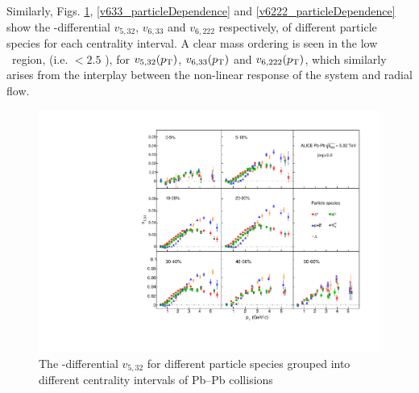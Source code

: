 \documentclass[ALICE,manyauthors]{cernphprep}
\providecommand{\DIFaddbeginFL}{} %
\providecommand{\DIFaddendFL}{} %
\providecommand{\DIFdelbeginFL}{} %
\providecommand{\DIFdelendFL}{} %
\begin{document}
Similarly, Figs. \ref{v523_particleDependence}, \ref{v633_particleDependence} and \ref{v6222_particleDependence} show the \pT-differential $v_{5,32}$, $v_{6,33}$ and $v_{6,222}$ respectively, of different particle species for each centrality interval. A clear mass ordering is seen in the low \pT~region, (i.e. \pT $< 2.5$ \GeV), for $v_{5,32}(p_{\rm{T}})$, $v_{6,33}(p_{\rm{T}})$ and $v_{6,222}(p_{\rm{T}})$, which similarly arises from the interplay between the non-linear response of the system and radial flow. 

\begin{figure}[!htb]
\begin{center}
\DIFdelbeginFL %
\DIFdelendFL %
\DIFaddbeginFL \includegraphics[scale=0.82]{figures/results/All_v523_gap00_PID2_3by3.pdf}

\DIFaddendFL \end{center}
\caption{The \pT-differential $v_{5,32}$ for different particle species grouped into different centrality intervals of Pb--Pb collisions \sNN}
\label{v523_particleDependence}
\end{figure}
\end{document}
